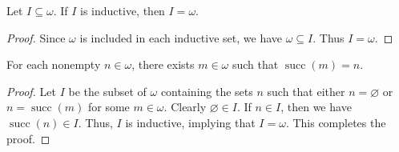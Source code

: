 \documentclass[11pt]{article}
\DeclareMathOperator{\suc}{succ}
\begin{document}
\begin{theorem}
  Let $I \subseteq \omega$.
  If $I$ is inductive, then $I = \omega$.
\end{theorem}
\begin{proof}
  Since $\omega$ is included in each inductive set, we have $\omega \subseteq I$.
  Thus $I = \omega$.
\end{proof}

\begin{proposition}
  For each nonempty $n \in \omega$, there exists $m \in \omega$ such that $\suc(m) = n$.
\end{proposition}
\begin{proof}
  Let $I$ be the subset of $\omega$ containing the sets $n$ such that either $n = \varnothing$ or $n = \suc(m)$ for some $m \in \omega$.
  Clearly $\varnothing \in I$.
  If $n \in I$, then we have $\suc(n) \in I$.
  Thus, $I$ is inductive, implying that $I = \omega$.
  This completes the proof.
\end{proof}
\end{document}
